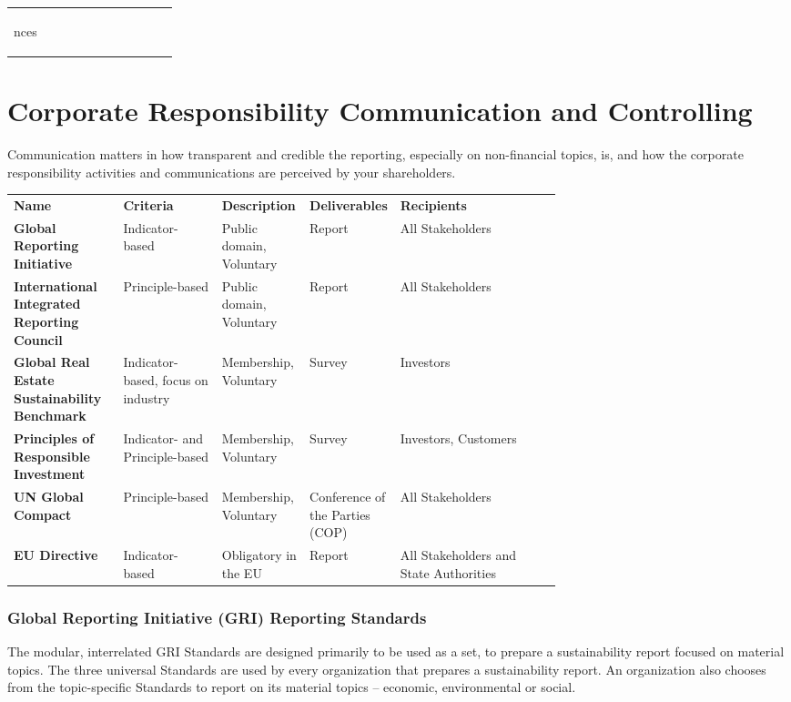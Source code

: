 \documentclass[11pt]{article}
\theoremstyle{definition}
\begin{document}
\begin{tabularx}{\linewidth}{p{0.22\linewidth} | p{0.22\linewidth} | p{0.22\linewidth} | p{0.22\linewidth}}
\begin{itemize}
nces
	\end{itemize}
\end{tabularx}

\clearpage
\section{Corporate Responsibility Communication and Controlling}
Communication matters in how transparent and credible the reporting, especially on non-financial topics, is, and how the corporate responsibility activities and communications are perceived by your shareholders.

\begin{tabularx}{\linewidth}{p{0.2\linewidth} p{0.18\linewidth} p{0.16\linewidth} p{0.16\linewidth} X}
	\cellcolor{SteelBlue1!75}\textbf{Name} & \cellcolor{SteelBlue1!75}\textbf{Criteria} & \cellcolor{SteelBlue1!75}\textbf{Description} & \cellcolor{SteelBlue1!75}\textbf{Deliverables} & \cellcolor{SteelBlue1!75}\textbf{Recipients}\\[0.5em]
	\textbf{Global Reporting Initiative} & Indicator-based & Public domain, Voluntary & Report & All Stakeholders\\[2.5em]
	\textbf{International Integrated Reporting Council} & Principle-based & Public domain, Voluntary & Report & All Stakeholders\\[3.5em]
	\textbf{Global Real Estate Sustainability Benchmark} & Indicator-based, focus on industry & Membership, Voluntary & Survey & Investors\\[3.5em]
	\textbf{Principles of Responsible Investment} & Indicator- and Principle-based & Membership, Voluntary & Survey & Investors, Customers\\[3.5em]
	\textbf{UN Global Compact} & Principle-based & Membership, Voluntary & Conference of the Parties (COP) & All Stakeholders\\[3.5em]
	\textbf{EU Directive} & Indicator-based & Obligatory in the EU & Report & All Stakeholders and State Authorities
\end{tabularx}

\subsubsection{Global Reporting Initiative (GRI) Reporting Standards}
The modular, interrelated GRI Standards are designed primarily to be used as a set, to prepare a sustainability report focused on material topics. The three universal Standards are used by every organization that prepares a sustainability report. An organization also chooses from the topic-specific Standards to report on its material topics – economic, environmental or social.
\end{document}
